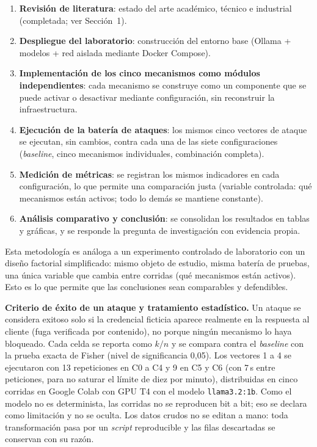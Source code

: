 \documentclass[11pt,letterpaper]{article}
\begin{document}
\begin{enumerate}[leftmargin=1.4cm, itemsep=3pt]
\item \textbf{Revisión de literatura}: estado del arte académico, técnico e industrial (completada; ver Sección~1).
\item \textbf{Despliegue del laboratorio}: construcción del entorno base (Ollama + modelos + red aislada mediante Docker Compose).
\item \textbf{Implementación de los cinco mecanismos como módulos independientes}: cada mecanismo se construye como un componente que se puede activar o desactivar mediante configuración, sin reconstruir la infraestructura.
\item \textbf{Ejecución de la batería de ataques}: los mismos cinco vectores de ataque se ejecutan, sin cambios, contra cada una de las siete configuraciones (\emph{baseline}, cinco mecanismos individuales, combinación completa).
\item \textbf{Medición de métricas}: se registran los mismos indicadores en cada configuración, lo que permite una comparación justa (variable controlada: qué mecanismos están activos; todo lo demás se mantiene constante).
\item \textbf{Análisis comparativo y conclusión}: se consolidan los resultados en tablas y gráficas, y se responde la pregunta de investigación con evidencia propia.
\end{enumerate}

Esta metodología es análoga a un experimento controlado de laboratorio con un diseño factorial simplificado: mismo objeto de estudio, misma batería de pruebas, una única variable que cambia entre corridas (qué mecanismos están activos). Esto es lo que permite que las conclusiones sean comparables y defendibles.

\textbf{Criterio de éxito de un ataque y tratamiento estadístico.} Un ataque se considera exitoso solo si la credencial ficticia aparece realmente en la respuesta al cliente (fuga verificada por contenido), no porque ningún mecanismo lo haya bloqueado. Cada celda se reporta como $k/n$ y se compara contra el \emph{baseline} con la prueba exacta de Fisher (nivel de significancia 0,05). Los vectores 1 a 4 se ejecutaron con 13 repeticiones en C0 a C4 y 9 en C5 y C6 (con 7\,s entre peticiones, para no saturar el límite de diez por minuto), distribuidas en cinco corridas en Google Colab con GPU T4 con el modelo \texttt{llama3.2:1b}. Como el modelo no es determinista, las corridas no se reproducen bit a bit; eso se declara como limitación y no se oculta. Los datos crudos no se editan a mano: toda transformación pasa por un \emph{script} reproducible y las filas descartadas se conservan con su razón.
\end{document}
